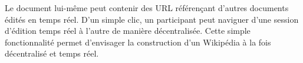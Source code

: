 
Le document lui-même peut contenir des URL référençant d'autres documents édités
en temps réel. D'un simple clic, un participant peut naviguer d'une session
d'édition temps réel à l'autre de manière décentralisée. Cette simple
fonctionnalité permet d'envisager la construction d'un Wikipédia à la fois
décentralisé et temps réel. 


